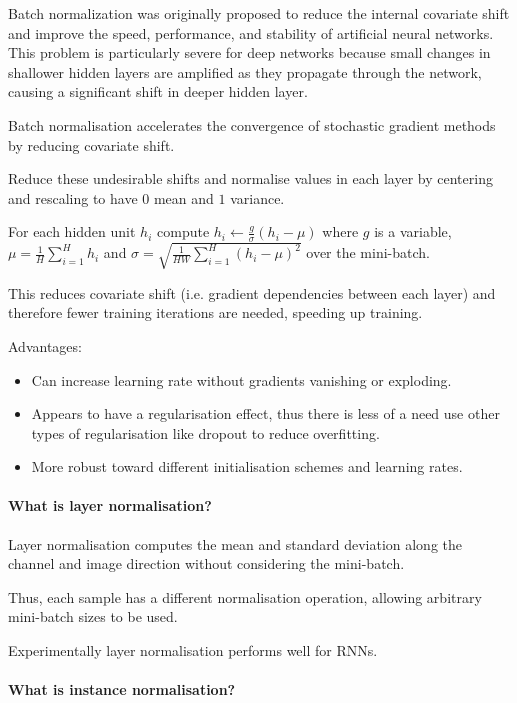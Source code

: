 Batch normalization \cite{ioffe2015batchnormalizationacceleratingdeep}
was originally proposed to reduce the internal
covariate shift and improve the speed, performance, and stability of
artificial neural networks. This problem is particularly severe for deep
networks because small changes in shallower hidden layers are amplified
as they propagate through the network, causing a significant shift in
deeper hidden layer.

Batch normalisation accelerates the convergence of stochastic gradient methods
by reducing covariate shift.

Reduce these undesirable shifts and normalise values in each layer by centering and rescaling to have $0$ mean and $1$ variance.

For each hidden unit $h_i$ compute $h_i \leftarrow \frac{g}{\sigma} (h_i - \mu)$
where $g$ is a variable, $\mu = \frac{1}{H} \sum_{i=1}^H{h_i}$ and
$\sigma = \sqrt{\frac{1}{HW} \sum_{i=1}^H{(h_i - \mu)^2}}$
over the mini-batch.

This reduces covariate shift (i.e. gradient dependencies between each layer) and therefore
fewer training iterations are needed, speeding up training.

Advantages:

\begin{itemize}
    \item Can increase learning rate without gradients vanishing or exploding.
    \item Appears to have a regularisation effect, thus there is less of a need
          use other types of regularisation like dropout to reduce overfitting.
    \item More robust toward different initialisation schemes and learning rates.
\end{itemize}

\paragraph{What is layer normalisation?}

Layer normalisation computes the mean and standard deviation
along the channel and image direction without considering the mini-batch.

Thus, each sample has a different normalisation operation,
allowing arbitrary mini-batch sizes to be used.

Experimentally layer normalisation performs well for RNNs.

\paragraph{What is instance normalisation?}

